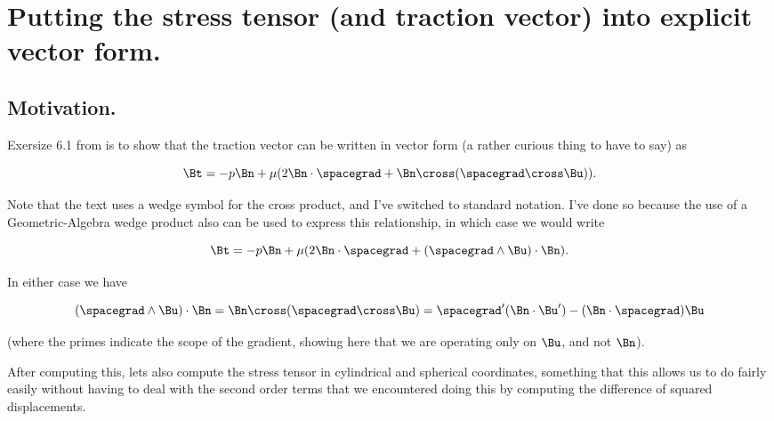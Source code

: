 
%

\chapter{Putting the stress tensor (and traction vector) into explicit vector form.}
\label{chap:continuumstressTensorVectorForm}
{}
\date{Apr 4, 2012}

\beginArtWithToc

\section{Motivation.}

Exersize 6.1 from \cite{acheson1990elementary} is to show that the traction vector can be written in vector form (a rather curious thing to have to say) as

\begin{equation}\label{eqn:stressTensorVectorForm:10}
\Bt = -p \Bn + \mu ( 2 \Bn \cdot \spacegrad + \Bn \cross (\spacegrad \cross \Bu)).
\end{equation}

Note that the text uses a wedge symbol for the cross product, and I've switched to standard notation.  I've done so because the use of a Geometric-Algebra wedge product also can be used to express this relationship, in which case we would write

\begin{equation}\label{eqn:stressTensorVectorForm:30}
\Bt = -p \Bn + \mu ( 2 \Bn \cdot \spacegrad + (\spacegrad \wedge \Bu) \cdot \Bn).
\end{equation}

In either case we have

\begin{equation}\label{eqn:stressTensorVectorForm:50}
(\spacegrad \wedge \Bu) \cdot \Bn
= 
\Bn \cross (\spacegrad \cross \Bu)
=
\spacegrad' (\Bn \cdot \Bu') - (\Bn \cdot \spacegrad) \Bu 
\end{equation}

(where the primes indicate the scope of the gradient, showing here that we are operating only on $\Bu$, and not $\Bn$).

After computing this, lets also compute the stress tensor in cylindrical and spherical coordinates, something that this allows us to do fairly easily without having to deal with the second order terms that we encountered doing this by computing the difference of squared displacements.

